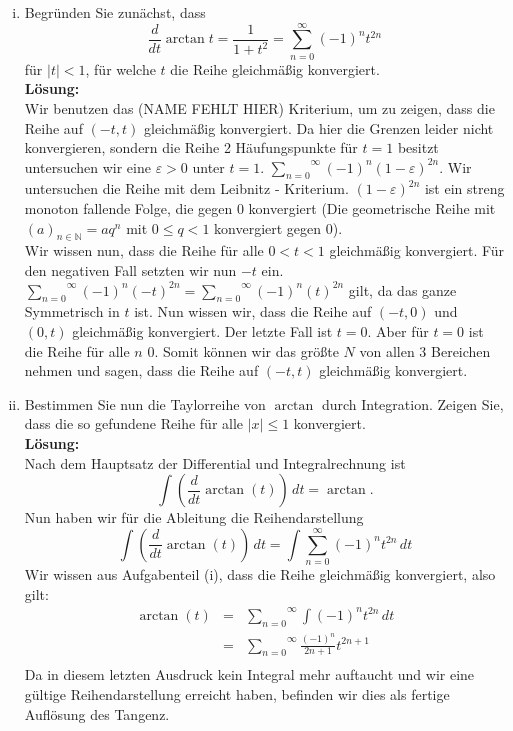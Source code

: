 \documentclass[11pt,a4paper,ngerman]{article}
\begin{document}
\begin{enumerate}[(i)]
    \item Begründen Sie zunächst, dass
        $$
            \frac{d}{dt} \arctan t = \frac{1}{1 + t^2} = \overset{\infty}{\underset{n=0}{\sum}} (-1)^nt^{2n}
        $$
        für $|t|<1$, für welche $t$ die Reihe gleichmäßig konvergiert.\\
    \textbf{Lösung:}\\
        Wir benutzen das (NAME FEHLT HIER) Kriterium, um zu zeigen, dass die Reihe auf $(-t,t)$ gleichmäßig
        konvergiert. Da hier die Grenzen leider nicht konvergieren, sondern die Reihe 2 Häufungspunkte
        für $t=1$ besitzt untersuchen wir eine $\varepsilon>0$ unter $t=1$.
        $\overset{\infty}{\underset{n=0}{\sum}} (-1)^n(1-\varepsilon)^{2n}$. Wir untersuchen die Reihe
        mit dem Leibnitz - Kriterium. $(1-\varepsilon)^{2n}$ ist ein streng monoton fallende Folge, die
        gegen 0 konvergiert (Die geometrische Reihe mit $(a)_{n\in\mathbb{N}} = aq^n$ mit $0\leq q < 1$
        konvergiert gegen 0).\\
        Wir wissen nun, dass die Reihe für alle $0<t<1$ gleichmäßig konvergiert. Für den negativen Fall
        setzten wir nun $-t$ ein. $\overset{\infty}{\underset{n=0}{\sum}} (-1)^n(-t)^{2n} =
        \overset{\infty}{\underset{n=0}{\sum}} (-1)^n(t)^{2n}$ gilt, da das ganze Symmetrisch in $t$ ist.
        Nun wissen wir, dass die Reihe auf $(-t,0)$ und $(0,t)$ gleichmäßig konvergiert.
        Der letzte Fall ist $t=0$. Aber für $t=0$ ist die Reihe für alle $n$ 0. Somit können wir
        das größte $N$ von allen 3 Bereichen nehmen und sagen, dass die Reihe auf $(-t,t)$ gleichmäßig
        konvergiert.

    \item Bestimmen Sie nun die Taylorreihe von $\arctan$ durch Integration. Zeigen Sie, dass die so
        gefundene Reihe für alle $|x|\leq 1$ konvergiert.\\
    \textbf{Lösung:}\\
        Nach dem Hauptsatz der Differential und Integralrechnung ist
        $$
            \int (\frac{d}{dt} \arctan (t) ) \, dt = \arctan.
        $$
        Nun haben wir für die Ableitung die Reihendarstellung
        $$
            \int (\frac{d}{dt} \arctan (t) ) \, dt 
                = \int \overset{\infty}{\underset{n=0}{\sum}} (-1)^nt^{2n} \, dt
        $$
        Wir wissen aus Aufgabenteil (i), dass die Reihe gleichmäßig konvergiert, also gilt:
        $$\begin{array}{rcl}
            \arctan (t) &=& \overset{\infty}{\underset{n=0}{\sum}} \int (-1)^nt^{2n} \, dt\\
                &=& \overset{\infty}{\underset{n=0}{\sum}} \frac{(-1)^n}{2n+1}t^{2n+1} \\
        \end{array}$$
        Da in diesem letzten Ausdruck kein Integral mehr auftaucht und wir eine gültige
        Reihendarstellung erreicht haben, befinden wir dies als fertige Auflösung des Tangenz.\\
        

\end{enumerate}
\end{document}
